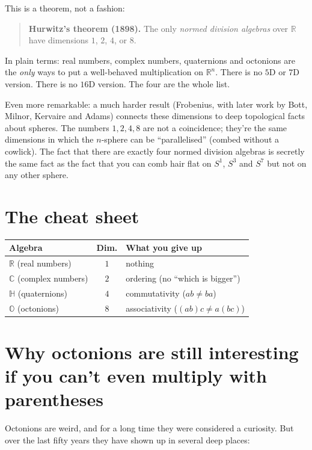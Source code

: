 \documentclass[11pt]{article}
\newcommand{\R}{\mathbb{R}}
\newcommand{\C}{\mathbb{C}}
\newcommand{\HH}{\mathbb{H}}
\newcommand{\OO}{\mathbb{O}}
\begin{document}
This is a theorem, not a fashion:

\begin{quote}
  \textbf{Hurwitz's theorem (1898).} The only \emph{normed division
  algebras} over $\R$ have dimensions $1$, $2$, $4$, or $8$.
\end{quote}

In plain terms: real numbers, complex numbers, quaternions and
octonions are the \emph{only} ways to put a well-behaved
multiplication on $\R^n$. There is no $5$D or $7$D version. There
is no $16$D version. The four are the whole list.

Even more remarkable: a much harder result (Frobenius, with later
work by Bott, Milnor, Kervaire and Adams) connects these dimensions
to deep topological facts about spheres. The numbers $1, 2, 4, 8$
are not a coincidence; they're the same dimensions in which the
$n$-sphere can be ``parallelised'' (combed without a cowlick). The
fact that there are exactly four normed division algebras is
secretly the same fact as the fact that you can comb hair flat on
$S^1$, $S^3$ and $S^7$ but not on any other sphere.

\section*{The cheat sheet}

\begin{center}
\begin{tabular}{lcl}
\textbf{Algebra} & \textbf{Dim.} & \textbf{What you give up} \\
\hline
$\R$ (real numbers)         & $1$ & nothing \\
$\C$ (complex numbers)      & $2$ & ordering (no ``which is bigger'') \\
$\HH$ (quaternions)         & $4$ & commutativity ($ab \neq ba$) \\
$\OO$ (octonions)           & $8$ & associativity ($(ab)c \neq a(bc)$) \\
\end{tabular}
\end{center}

\section*{Why octonions are still interesting if you can't even multiply with parentheses}

Octonions are weird, and for a long time they were considered a
curiosity. But over the last fifty years they have shown up in
several deep places:
\end{document}
